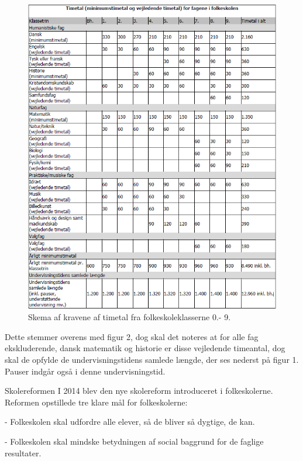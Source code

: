 \begin{figure}[h]
  \centering
  \includegraphics[scale = 0.9]{partials/graphics/overallskemaovertimetal.png}
  \caption{Skema af kravene af timetal fra folkeskoleklasserne 0.- 9.}
  \label{fig:Timetal}
\end{figure}

Dette stemmer overens med figur 2,\cite{timetalifolkeskolen2016} dog skal det noteres at for alle fag ekskluderende, dansk matematik og historie \cite{dennyefolkeskole} er disse vejledende timeantal, dog skal de opfylde de undervisningstidens samlede længde, der ses nederst på figur 1. Pauser indgår også i denne undervisningstid.\cite{lov2016}
 	
Skolereformen
I 2014 blev den nye skolereform introduceret i folkeskolerne. Reformen opstillede tre klare mål for folkeskolerne:\cite{dennyefolkeskole}

-	Folkeskolen skal udfordre alle elever, så de bliver så dygtige, de kan.

-	Folkeskolen skal mindske betydningen af social baggrund for de faglige resultater.

